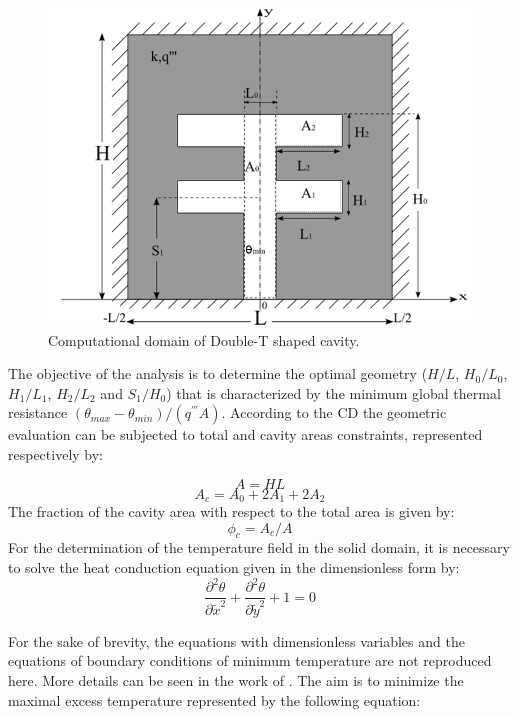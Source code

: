 \documentclass[12pt,fleqn]{article}
\newcommand\tab[1][0.75cm]{\hspace*{#1}}
\begin{document}
\begin{figure}[H]
\centering
\includegraphics[width=0.6\linewidth]{imgs/duplo_t.png}
\caption{ {\small Computational domain of Double-T shaped cavity.}}
\label{figure01}
\end{figure}

The objective of the analysis is to determine the optimal geometry ($H/L$, $H_{0}/L_{0}$, $H_{1}/L_{1}$, $H_{2}/L_{2}$ and $S_{1}/H_{0}$) that is characterized by the minimum global thermal resistance $(\theta_{max} - \theta_{min})/(q^{'''}A)$. According to the CD the geometric evaluation can be subjected to total and cavity areas constraints, represented respectively by:

\begin{equation}
A = HL \label{area_total}
\end{equation}
\begin{equation}
A_{c} = A_{0} + 2A_{1} + 2A_{2} \label{area_cavidade}
\end{equation}
\tab The fraction of the cavity area with respect to the total area is given by:
\begin{equation}
\phi_{c} = A_{c}/A \label{fi}
\end{equation}
\tab For the determination of the temperature field in the solid domain, it is necessary to solve the heat conduction equation given in the dimensionless form by:
\begin{equation}
\frac{\partial^{2} \theta}{\partial \tilde{x}^{2}}+\frac{\partial^{2} \theta}{\partial \tilde{y}^{2}}+1=0\label{calor}
\end{equation}

For the sake of brevity, the equations with dimensionless variables and the equations of boundary conditions of minimum temperature are not reproduced here. More details can be seen in the work of \cite{Gonzales2015b}. The aim is to minimize the maximal excess temperature represented by the following equation:
\end{document}

